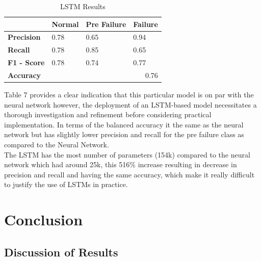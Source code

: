 \documentclass{article}
\begin{document}
\begin{table}[htbp]
\caption{LSTM Results}
\centering
\begin{tabular}{|l|lll|}
\hline
                    & \multicolumn{1}{l|}{\textbf{Normal}} & \multicolumn{1}{l|}{\textbf{Pre Failure}} & \textbf{Failure} \\ \hline
\textbf{Precision}  & \multicolumn{1}{l|}{0.78}               & \multicolumn{1}{l|}{0.65}                    & 0.94             \\ \hline
\textbf{Recall}     & \multicolumn{1}{l|}{0.78}            & \multicolumn{1}{l|}{0.85}                    & 0.65                \\ \hline
\textbf{F1 - Score} & \multicolumn{1}{l|}{0.78}            & \multicolumn{1}{l|}{0.74}                    & 0.77             \\ \hline
\textbf{Accuracy}   & \multicolumn{3}{r|}{0.76}                                                                           \\ \hline
\end{tabular}
\end{table}

Table 7 provides a clear indication that this particular model is on par with the neural network however, the deployment of an LSTM-based model necessitates a thorough investigation and refinement before considering practical implementation. In terms of the balanced accuracy it the same as the neural network but has slightly lower precision and recall for the pre failure class as compared to the Neural Network.\\

The LSTM has the most number of parameters (154k) compared to the neural network which had around 25k, this 516\% increase resulting in decrease in precision and recall and having the same accuracy, which make it really difficult to justify the use of LSTMs in practice.

\section{Conclusion}

\subsection{Discussion of Results}
\end{document}
